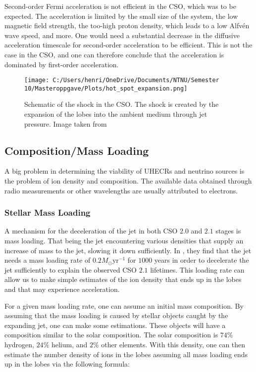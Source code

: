 Second-order Fermi acceleration is not efficient in the CSO, which was to be expected. The acceleration is limited by the small size of the system, the low magnetic field strength, the too-high proton density, which leads to a low Alfvén wave speed, and more. One would need a substantial decrease in the diffusive acceleration timescale for second-order acceleration to be efficient. This is not the case in the CSO, and one can therefore conclude that the acceleration is dominated by first-order acceleration.

\begin{figure}
    \centering
    \texttt{[image: C:/Users/henri/OneDrive/Documents/NTNU/Semester 10/Masteroppgave/Plots/hot\_spot\_expansion.png]}
    \caption{Schematic of the shock in the CSO. The shock is created by the expansion of the lobes into the ambient medium through jet pressure. Image taken from \cite{Perucho_2002}}
    \label{fig:CSO_shock}
\end{figure}



\subsection{Composition/Mass Loading}
A big problem in determining the viability of UHECRs and neutrino sources is the problem of ion density and composition. The available data obtained through radio measurements or other wavelengths are usually attributed to electrons.

\subsubsection{Stellar Mass Loading}
A mechanism for the deceleration of the jet in both CSO $2.0$ and $2.1$ stages is mass loading. That being the jet encountering various densities that supply an increase of mass to the jet, slowing it down sufficiently. In \cite{sullivan2024smallscale}, they find that the jet needs a mass loading rate of $0.2 M_{\odot} \text{yr}^{-1}$ for $1000$ years in order to decelerate the jet sufficiently to explain the observed CSO $2.1$ lifetimes. This loading rate can allow us to make simple estimates of the ion density that ends up in the lobes and that may experience acceleration.

For a given mass loading rate, one can assume an initial mass composition. By assuming that the mass loading is caused by stellar objects caught by the expanding jet, one can make some estimations. These objects will have a composition similar to the solar composition. The solar composition is $74\%$ hydrogen, $24\%$ helium, and $2\%$ other elements. With this density, one can then estimate the number density of ions in the lobes assuming all mass loading ends up in the lobes via the following formula:

